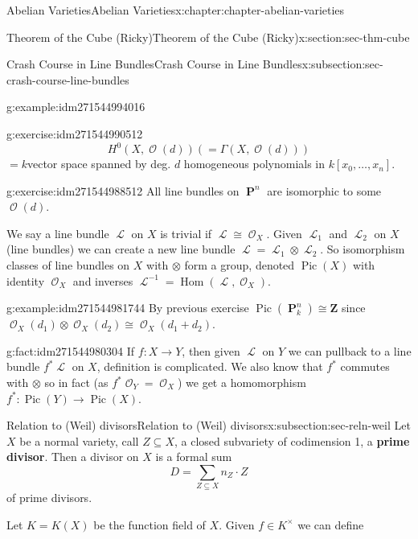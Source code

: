 \documentclass[oneside,10pt,]{book}
\newcommand{\terminology}[1]{\textbf{#1}}
\numberwithin{equation}{section}
\newcommand{\sheaf}[1]{\operatorname{\mathcal{#1}}}
\newcommand{\ZZ}{\mathbf{Z}}
\DeclareMathOperator{\Hom}{Hom}
\DeclareMathOperator{\Pic}{Pic}
\DeclareMathOperator{\PP}{\mathbf{P}}
\begin{document}
\begin{chapterptx}{Abelian Varieties}{}{Abelian Varieties}{}{}{x:chapter:chapter-abelian-varieties}
\begin{sectionptx}{Theorem of the Cube (Ricky)}{}{Theorem of the Cube (Ricky)}{}{}{x:section:sec-thm-cube}
\begin{subsectionptx}{Crash Course in Line Bundles}{}{Crash Course in Line Bundles}{}{}{x:subsection:sec-crash-course-line-bundles}
\begin{example}{}{g:example:idm271544994016}
\end{example}
\begin{inlineexercise}{}{g:exercise:idm271544990512}%
%
\begin{equation*}
H^0(X,\sheaf O(d)) ( = \Gamma (X,\sheaf O(d)))
\end{equation*}
\(= k\)vector space spanned by deg. \(d\) homogeneous polynomials in \(k[x_0,\ldots, x_n]\).%
\end{inlineexercise}
\begin{inlineexercise}{}{g:exercise:idm271544988512}%
All line bundles on \(\PP^n\) are isomorphic to some \(\sheaf O(d)\).%
\end{inlineexercise}
We say a line bundle \(\sheaf L\) on \(X\) is trivial if \(\sheaf L \cong \sheaf O_X\). Given \(\sheaf L_1\) and \(\sheaf L_2\) on \(X\) (line bundles) we can create a new line bundle \(\sheaf L = \sheaf L_1 \otimes \sheaf L_2\). So isomorphism classes of line bundles on \(X\) with \(\otimes\) form a group, denoted \(\Pic(X)\) with identity \(\sheaf O_X\) and inverses \(\sheaf L^{-1} = \Hom(\sheaf L , \sheaf O_X)\).%
\begin{example}{}{g:example:idm271544981744}%
By previous exercise \(\Pic(\PP_k^n) \cong \ZZ\) since \(\sheaf O_X(d_1) \otimes \sheaf O_X(d_2)  \cong \sheaf O_X(d_1+d_2)\).%
\end{example}
\begin{fact}{}{}{g:fact:idm271544980304}%
If \(f\colon X \to Y\), then given \(\sheaf L\) on \(Y\) we can pullback to a line bundle \(f^* \sheaf L\) on \(X\), definition is complicated. We also know that \(f^*\) commutes with \(\otimes\) so in fact (as \(f^*\sheaf O_Y = \sheaf O_X\)) we get a homomorphism \(f^* \colon \Pic(Y) \to \Pic(X)\).%
\end{fact}
\end{subsectionptx}
%
%
\typeout{************************************************}
\typeout{************************************************}
%
\begin{subsectionptx}{Relation to (Weil) divisors}{}{Relation to (Weil) divisors}{}{}{x:subsection:sec-reln-weil}
Let \(X\) be a normal variety, call \(Z\subseteq X\), a closed subvariety of codimension 1, a \terminology{prime divisor}. Then a divisor on \(X\) is a formal sum%
\begin{equation*}
D = \sum_{Z\subseteq X} n_Z\cdot Z
\end{equation*}
of prime divisors.%
\par
Let \(K = K(X)\) be the function field of \(X\). Given \(f\in K^\times\) we can define%

\end{subsectionptx}
\end{sectionptx}
\end{chapterptx}
\end{document}
